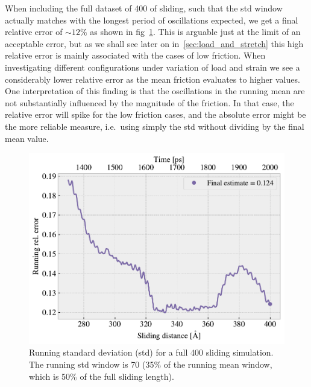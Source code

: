 When including the full dataset of \SI{400}{} of sliding, such that the \acrshort{std} window actually matches with the longest period of oscillations expected, we get a final relative error of $\sim 12 \%$ as shown in fig~\cref{fig:runstd_long}. This is arguable just at the limit of an acceptable error, but as we shall see later on in~\cref{sec:load_and_stretch} this high relative error is mainly associated with the cases of low friction. When investigating different configurations under variation of load and strain we see a considerably lower relative error as the mean friction evaluates to higher values. One interpretation of this finding is that the oscillations in the running mean are not substantially influenced by the magnitude of the friction. In that case, the relative error will spike for the low friction cases, and the absolute error might be the more reliable measure, i.e.\ using simply the \acrshort{std} without dividing by the final mean value.


\begin{figure}[H]
  \centering
  \includegraphics[width=0.6\linewidth]{figures/baseline/Ff_runstd_long.pdf}
  \caption{Running standard deviation (std) for a full \SI{400}{{}} sliding simulation. The running std window is \SI{70}{} (35\% of the running mean window, which is 50\% of the full sliding length).}
  \label{fig:runstd_long}
\end{figure}



